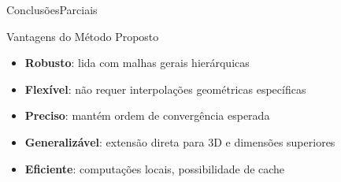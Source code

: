 \documentclass[../main/main.tex]{subfiles}
\begin{document}
%

\begin{frame}{ConclusõesParciais}
\begin{block}{Vantagens do Método Proposto}
\begin{itemize}
\item \textbf{Robusto}: lida com malhas gerais hierárquicas
\item \textbf{Flexível}: não requer interpolações geométricas específicas
\item \textbf{Preciso}: mantém ordem de convergência esperada
\item \textbf{Generalizável}: extensão direta para 3D e dimensões superiores
\item \textbf{Eficiente}: computações locais, possibilidade de cache
\end{itemize}
\end{block}
\end{frame}
\end{document}
